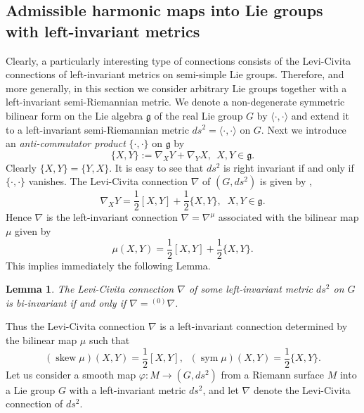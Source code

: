 \documentclass[12pt]{amsart}
\newtheorem{Lemma}[Theorem]{Lemma}
\theoremstyle{definition}
\theoremstyle{remark}
\numberwithin{equation}{section}
\begin{document}
\subsection{Admissible harmonic maps into Lie groups with left-invariant metrics}
 Clearly, a particularly interesting type of connections consists of 
 the Levi-Civita connections of left-invariant metrics on semi-simple Lie groups.
 Therefore, and more generally, in this section  we consider arbitrary Lie groups 
 together with a left-invariant semi-Riemannian metric.
 We denote a non-degenerate symmetric bilinear form   on the Lie 
 algebra $\mathfrak{g}$ of the  real Lie group $G$  by $\langle\cdot,\cdot\rangle$ 
 and extend it to a left-invariant semi-Riemannian metric 
 $ds^2=\langle \cdot,\cdot\rangle$ on $G$.
 Next we introduce an \textit{anti-commutator product} 
 $\{\cdot,\cdot\}$ on $\mathfrak{g}$ by 
\begin{equation}\label{NR}
 \{X,Y\}:=\nabla_{X}Y+\nabla_{Y}X, \ \  X,Y\in \mathfrak{g}.
\end{equation}
 Clearly $\{X,Y\}=\{Y,X\}$.
 It is easy to see that  $ds^2$ is right invariant if and only if 
 $\{\cdot, \cdot\}$ vanishes.
 The Levi-Civita connection $\nabla$ of $(G,ds^2)$ is given by 
\cite[Proposition 3.18]{CE}, 
\begin{equation}\label{Levi-CivitaRelation}
 \nabla_{X}Y=\frac{1}{2}[X,Y]+\frac{1}{2}\{X, Y\}, \;\;X, Y \in \mathfrak g.
\end{equation}
 Hence $\nabla$ is the left-invariant connection 
 $\nabla = \nabla^{\mu}$  associated with  the bilinear map $\mu$ given by
\begin{equation*}
 \mu(X, Y)=\frac{1}{2}[X,Y] +\frac{1}{2}\{X, Y\}.
\end{equation*}
This implies immediately the following Lemma.
\begin{Lemma}
The Levi-Civita connection $\nabla$ of some  left-invariant metric 
 $ds^2$ on $G$  is bi-invariant if and only if $\nabla={{}^{(0)}\nabla}$.
\end{Lemma}
 Thus the Levi-Civita connection $\nabla$ is a left-invariant 
 connection determined by the bilinear map $\mu$ such that 
\begin{equation}\label{eq:skew-symm}
({\operatorname {skew}} \mu)(X,Y)=\frac{1}{2}[X,Y],
\;\;
({\operatorname {sym}} \mu)(X,Y)=\frac{1}{2}\{X,Y\}.
\end{equation}
 Let us consider a smooth map $\varphi:M\to (G,ds^2)$ 
 from a Riemann surface $M$ into a Lie group $G$ with a 
 left-invariant metric $ds^2$, 
 and let $\nabla$ denote the Levi-Civita connection of $ds^2$.
\end{document}
